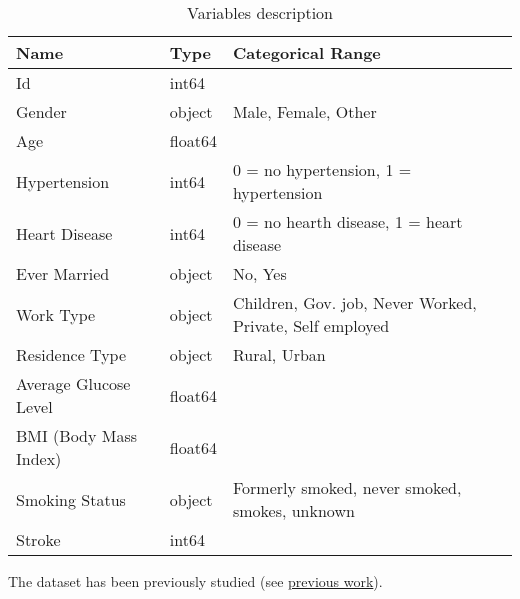\documentclass[12pt, a4paper]{article}
\begin{document}
\begin{table}[H]
\hskip-1.0cm\begin{tabular}{l|l|l}
Name                       & Type    & Categorical Range \\ \hline
Id                         & int64   &  \\ 
Gender                     & object  & Male, Female, Other   \\
Age                        & float64 & \\
Hypertension               & int64   & 0 = no hypertension, 1 = hypertension   \\
Heart Disease              & int64   & 0 = no hearth disease, 1 = heart disease  \\
Ever Married               & object  & No, Yes   \\
Work Type                  & object  & Children, Gov. job, Never Worked, Private, Self employed   \\
Residence Type             & object  & Rural, Urban   \\
Average Glucose Level      & float64 &   \\
BMI (Body Mass Index)      & float64 &   \\
Smoking Status             & object  & Formerly smoked, never smoked, smokes, unknown   \\
Stroke                     & int64   &   \\
\end{tabular}
\caption{Variables description}
\end{table}

The dataset has been previously studied (see \href{https://www.kaggle.com/fedesoriano/stroke-prediction-dataset/code}{previous work}).



\end{document}
